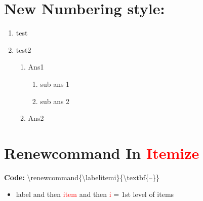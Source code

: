 \documentclass[a4paper, 10pt]{book}
\begin{document}
\newpage
\section{New Numbering style: }
\begin{enumerate}[{\bf Q.1 :}]
	\item test
	\item test2
	\begin{enumerate} [{\bf {A}ns (a):}]
		\item Ans1
		\begin{enumerate}	[{\bf Sub {A}ns (i):}]
			\item sub ans 1
			\item sub ans 2
		\end{enumerate}
		\item Ans2
	\end{enumerate}
\end{enumerate}

\newpage
\section{Renewcommand In \textcolor{red}{Itemize}}

\textbf{Code:} \textbackslash renewcommand\{\textbackslash labelitemi\}\{\textbackslash textbf\{--\}\}
\begin{itemize}
	\item label and then \textcolor{red}{item} and then \textcolor{red}{i} = 1st level of items
\end{itemize}

\renewcommand{\labelitemi}{\textcolor{red}{\textbf{--} $\rightarrow$}}	%
\renewcommand{\labelitemii}{\textcolor{red}{$\bigstar$}}	%
\renewcommand{\labelitemiii}{\labelitemi \textcolor{yellow}{$\Diamond$}}  %
\renewcommand{\labelitemiv}{\textcolor{yellow}{$\blacksquare$}}
\end{document}
